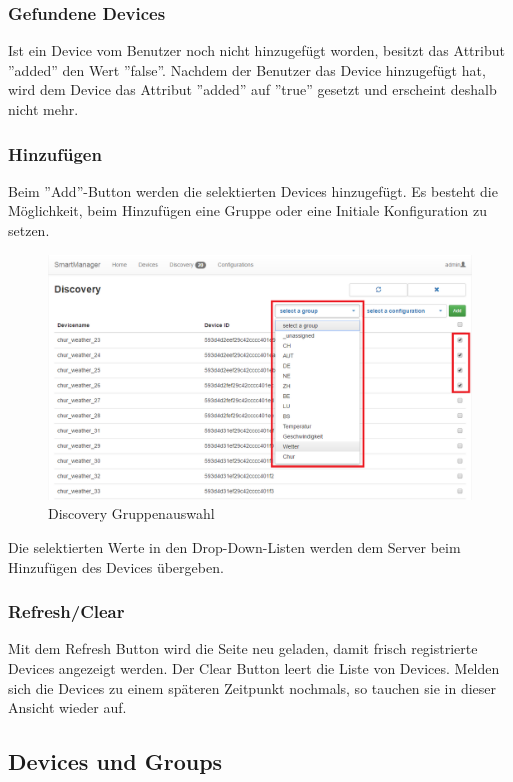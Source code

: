 \subsubsection{Gefundene Devices}
Ist ein Device vom Benutzer noch nicht hinzugefügt worden, besitzt das Attribut ''added'' den Wert ''false''. Nachdem der Benutzer das Device hinzugefügt hat, wird dem Device das Attribut ''added'' auf ''true'' gesetzt und erscheint deshalb nicht mehr.

\subsubsection{Hinzufügen}
Beim ''Add''-Button werden die selektierten Devices hinzugefügt. Es besteht die Möglichkeit, beim Hinzufügen eine Gruppe oder eine Initiale Konfiguration zu setzen.

\begin{figure}[H]
\centering
\includegraphics[scale=0.57]{../04_Realisierung/images/userinterface/discovery_addgroup.png}
\caption{Discovery Gruppenauswahl}
\end{figure}

Die selektierten Werte in den Drop-Down-Listen werden dem Server beim Hinzufügen des Devices übergeben.

\subsubsection{Refresh/Clear}
Mit dem Refresh Button wird die Seite neu geladen, damit frisch registrierte Devices angezeigt werden. Der Clear Button leert die Liste von Devices. Melden sich die Devices zu einem späteren Zeitpunkt nochmals, so tauchen sie in dieser Ansicht wieder auf.


\subsection{Devices und Groups}
